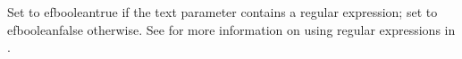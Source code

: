     Set to \app{}efbooleantrue if the text parameter contains a regular
    expression; set to \app{}efbooleanfalse otherwise. See 
    for more information on using regular expressions in \app{}.